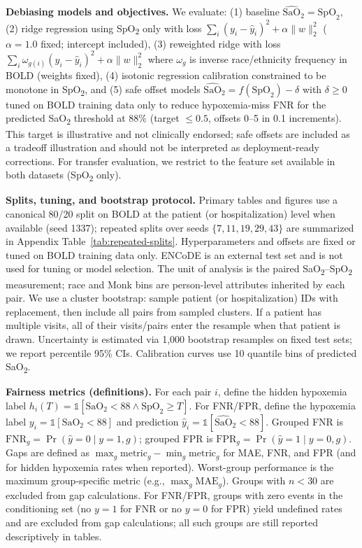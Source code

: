 \documentclass[pmlr]{jmlr}%
\begin{document}
\textbf{Debiasing models and objectives.} We evaluate: (1) baseline $\hat{\text{SaO}}_2 = \text{SpO}_2$, (2) ridge regression using SpO\textsubscript{2} only with loss $\sum_i (y_i - \hat{y}_i)^2 + \alpha \lVert w \rVert_2^2$ ($\alpha=1.0$ fixed; intercept included), (3) reweighted ridge with loss $\sum_i \omega_{g(i)} (y_i - \hat{y}_i)^2 + \alpha \lVert w \rVert_2^2$ where $\omega_{g}$ is inverse race/ethnicity frequency in BOLD (weights fixed), (4) isotonic regression calibration constrained to be monotone in SpO\textsubscript{2}, and (5) safe offset models $\hat{\text{SaO}}_2 = f(\text{SpO}_2) - \delta$ with $\delta \ge 0$ tuned on BOLD training data only to reduce hypoxemia-miss FNR for the predicted SaO\textsubscript{2} threshold at 88\% (target $\le 0.5$, offsets 0--5 in 0.1 increments). This target is illustrative and not clinically endorsed; safe offsets are included as a tradeoff illustration and should not be interpreted as deployment-ready corrections. For transfer evaluation, we restrict to the feature set available in both datasets (SpO\textsubscript{2} only).

\textbf{Splits, tuning, and bootstrap protocol.} Primary tables and figures use a canonical 80/20 split on BOLD at the patient (or hospitalization) level when available (seed 1337); repeated splits over seeds $\{7,11,19,29,43\}$ are summarized in Appendix Table~\ref{tab:repeated-splits}. Hyperparameters and offsets are fixed or tuned on BOLD training data only. ENCoDE is an external test set and is not used for tuning or model selection. The unit of analysis is the paired SaO\textsubscript{2}--SpO\textsubscript{2} measurement; race and Monk bins are person-level attributes inherited by each pair. We use a cluster bootstrap: sample patient (or hospitalization) IDs with replacement, then include all pairs from sampled clusters. If a patient has multiple visits, all of their visits/pairs enter the resample when that patient is drawn. Uncertainty is estimated via 1,000 bootstrap resamples on fixed test sets; we report percentile 95\% CIs. Calibration curves use 10 quantile bins of predicted SaO\textsubscript{2}.

\textbf{Fairness metrics (definitions).} For each pair $i$, define the hidden hypoxemia label $h_i(T) = \mathbb{1}[\text{SaO}_2 < 88 \land \text{SpO}_2 \ge T]$. For FNR/FPR, define the hypoxemia label $y_i=\mathbb{1}[\text{SaO}_2 < 88]$ and prediction $\hat{y}_i=\mathbb{1}[\hat{\text{SaO}}_2 < 88]$. Grouped FNR is $\text{FNR}_g = \Pr(\hat{y}=0 \mid y=1, g)$; grouped FPR is $\text{FPR}_g = \Pr(\hat{y}=1 \mid y=0, g)$. Gaps are defined as $\max_g \text{metric}_g - \min_g \text{metric}_g$ for MAE, FNR, and FPR (and for hidden hypoxemia rates when reported). Worst-group performance is the maximum group-specific metric (e.g., $\max_g \text{MAE}_g$). Groups with $n<30$ are excluded from gap calculations. For FNR/FPR, groups with zero events in the conditioning set (no $y=1$ for FNR or no $y=0$ for FPR) yield undefined rates and are excluded from gap calculations; all such groups are still reported descriptively in tables.
\end{document}
